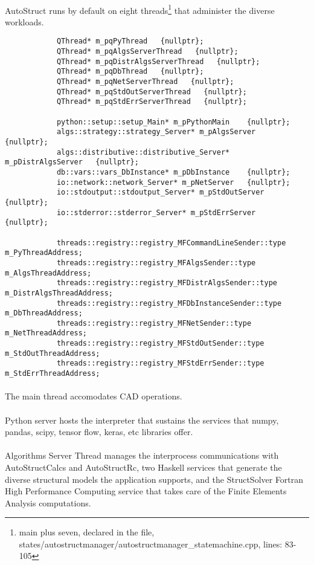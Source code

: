 \paragraph{}
AutoStruct runs by default on eight threads\footnote{main plus seven, declared in the file, states/autostructmanager/autostructmanager\_statemachine.cpp, lines: 83-105} that administer the diverse workloads.
\begin{verbatim}
            QThread* m_pqPyThread   {nullptr};
            QThread* m_pqAlgsServerThread   {nullptr};
            QThread* m_pqDistrAlgsServerThread   {nullptr};
            QThread* m_pqDbThread   {nullptr};
            QThread* m_pqNetServerThread   {nullptr};
            QThread* m_pqStdOutServerThread   {nullptr};
            QThread* m_pqStdErrServerThread   {nullptr};

            python::setup::setup_Main* m_pPythonMain    {nullptr};
            algs::strategy::strategy_Server* m_pAlgsServer   {nullptr};
            algs::distributive::distributive_Server* m_pDistrAlgsServer   {nullptr};
            db::vars::vars_DbInstance* m_pDbInstance    {nullptr};
            io::network::network_Server* m_pNetServer   {nullptr};
            io::stdoutput::stdoutput_Server* m_pStdOutServer   {nullptr};
            io::stderror::stderror_Server* m_pStdErrServer   {nullptr};

            threads::registry::registry_MFCommandLineSender::type m_PyThreadAddress;
            threads::registry::registry_MFAlgsSender::type m_AlgsThreadAddress;
            threads::registry::registry_MFDistrAlgsSender::type m_DistrAlgsThreadAddress;
            threads::registry::registry_MFDbInstanceSender::type m_DbThreadAddress;
            threads::registry::registry_MFNetSender::type m_NetThreadAddress;
            threads::registry::registry_MFStdOutSender::type m_StdOutThreadAddress;
            threads::registry::registry_MFStdErrSender::type m_StdErrThreadAddress;
\end{verbatim}
\paragraph{}
The main thread accomodates CAD operations.
\paragraph{}
Python server hosts the interpreter that sustains the services that numpy, pandas, scipy, tensor flow, keras, etc libraries offer.
\paragraph{}
Algorithms Server Thread manages the interprocess communications with AutoStructCalcs and AutoStructRc, two Haskell services that generate the diverse structural models the application supports, and the StructSolver Fortran High Performance Computing service that takes care of the Finite Elements Analysis computations.
